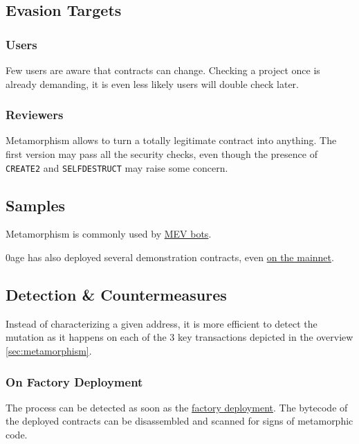 \subsection{Evasion Targets}

\subsubsection{Users}

Few users are aware that contracts can change.
Checking a project once is already demanding, it is even less likely users will double check later.

\subsubsection{Reviewers}

Metamorphism allows to turn a totally legitimate contract into anything.
The first version may pass all the security checks, even though the presence of \lstinline{CREATE2} and \lstinline{SELFDESTRUCT} may raise some concern.

\subsection{Samples}

Metamorphism is commonly used by \href{\urladdressmevbot}{MEV bots}.

0age has also deployed several demonstration contracts, even \href{\urladdressmetamorphicfactory}{on the mainnet}.

\subsection{Detection \& Countermeasures}

Instead of characterizing a given address, it is more efficient to detect the mutation as it happens on each of the 3 key transactions depicted in the overview \ref{sec:metamorphism}.

\subsubsection{On Factory Deployment}

The process can be detected as soon as the \href{\urltxmetamorphismstepone}{factory deployment}.
The bytecode of the deployed contracts can be disassembled and scanned for signs of metamorphic code.



